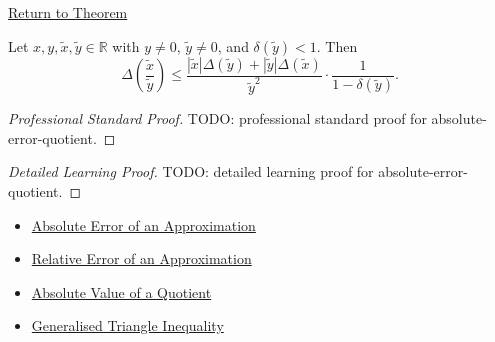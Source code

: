 \newpage
{}
\label{prf:absolute-error-quotient}

\begin{remark*}[Return]
\hyperref[thm:absolute-error-quotient]{Return to Theorem}
\end{remark*}

\begin{theorem*}
Let $x,y,\widetilde{x},\widetilde{y}\in\mathbb{R}$ with
$y\neq 0$, $\widetilde{y}\neq 0$, and
$\delta(\widetilde{y})<1$. Then
\[
  \Delta\!\left(\frac{\widetilde{x}}{\widetilde{y}}\right)
  \leq
  \frac{
    |\widetilde{x}|\Delta(\widetilde{y})
    +
    |\widetilde{y}|\Delta(\widetilde{x})
  }{\widetilde{y}^{2}}
  \cdot
  \frac{1}{1-\delta(\widetilde{y})}.
\]
\end{theorem*}

\begin{proof}[Professional Standard Proof]
\LRAProofBodyStart
TODO: professional standard proof for absolute-error-quotient.
\end{proof}

\begin{proof}[Detailed Learning Proof]
\LRAProofBodyStart
TODO: detailed learning proof for absolute-error-quotient.
\end{proof}

\begin{remark*}
\end{remark*}

\begin{dependencies}
\begin{itemize}
  \item \hyperref[def:absolute-error-approximation]{Absolute Error of an Approximation}
  \item \hyperref[def:relative-error-approximation]{Relative Error of an Approximation}
  \item \hyperref[thm:absolute-value-quotient]{Absolute Value of a Quotient}
  \item \hyperref[thm:absolute-value-sum-bound]{Generalised Triangle Inequality}
\end{itemize}
\end{dependencies}

\clearpage
